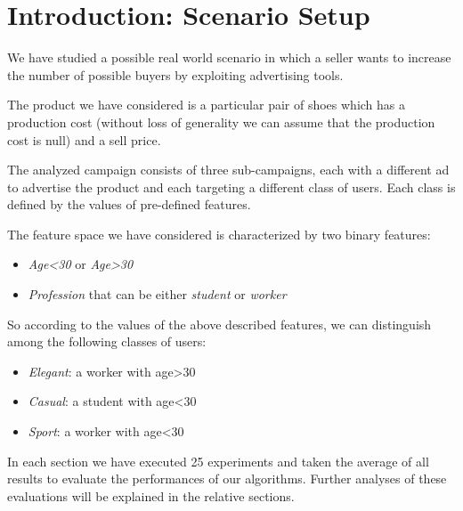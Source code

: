 \chapter{Introduction: Scenario Setup}
We have studied a possible real world scenario in which a seller wants to increase the number of possible buyers by exploiting advertising tools.

The product we have considered is a particular pair of shoes which has a production cost (without loss of generality we can assume that the production cost is null) and a sell price.

The analyzed campaign consists of three sub-campaigns, each with a different ad to advertise the product and each targeting a different class of users. Each class is defined by the values of pre-defined features.

The feature space we have considered is characterized by two binary features:
\begin{itemize}
    \item \textit{Age<30} or \textit{Age>30}
    \item \textit{Profession} that can be either \textit{student} or \textit{worker}
\end{itemize}

So according to the values of the above described features, we can distinguish among the following classes of users:
\begin{itemize}
    \item \textit{Elegant}: a worker with age>30
    \item \textit{Casual}: a student with age<30
    \item \textit{Sport}: a worker with age<30
\end{itemize}

In each section we have executed 25 experiments and taken the average of all results to evaluate the performances of our algorithms.
Further analyses of these evaluations will be explained in the relative sections.
